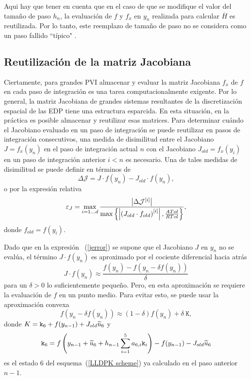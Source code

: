 Aqui hay que tener en cuenta que en el caso de que se modifique el valor del tamaño de paso $h_{n}$, la evaluación de $f$ y $f_x$ en $y_n$ realizada para calcular $\overline{H}$ es reutilizada. Por lo tanto, este reemplazo de tamaño de paso no se considera como un paso fallido ``típico" .

\subsection{Reutilización de la matriz Jacobiana}\label{secc:jaccontrol}
Ciertamente, para grandes PVI almacenar y evaluar la matriz Jacobiana $f_x$ de $f$ en cada paso de integración es una tarea computacionalmente exigente. Por lo general, la matriz Jacobiana de grandes sistemas resultantes de la discretización espacial de las EDP tiene una estructura esparcida. En esta situación, en la práctica es posible almacenar y reutilizar esas matrices. Para determinar cuándo el Jacobiano evaluado en un paso de integración se puede reutilizar en pasos de integración consecutivos, una medida de disimilitud entre el Jacobiano $J=f_x(y_n)$ en el paso de integración actual $n$ con el Jacobiano $J_{old}= f_x(y_{i})$ en un paso de integración anterior $i<n$ es necesario. Una de tales medidas de disimilitud se puede definir en términos de
\begin{equation*}
    \Delta \mathcal{J} = J\cdot f(y_n) - J_{old}\cdot f(y_n),
\end{equation*}
o por la expresión relativa
\begin{equation}\label{jerror}
    \varepsilon_J = \max_{i=1\ldots d}\frac{\left\lvert \Delta \mathcal{J}^{[i]} \right\rvert}
    {\max\left\{ \left\lvert  \left(J_{old}\cdot f_{old}\right)^{[i]}  \right\rvert ,\frac{ATol}{RTol} \right\}},
\end{equation}
donde $f_{old}=f(y_i)$.

Dado que en la expresión ~(\ref{jerror}) se supone que el Jacobiano $J$ en $y_n$ no se evalúa, el término $J\cdot f(y_n)$ es
aproximado por el cociente diferencial hacia atrás
\begin{equation}\label{backapprox}
    J\cdot f(y_n) \approx \frac{f(y_n) -
        f\left(y_n-\delta f(y_n)\right)}{\delta}
\end{equation}
para un $\delta>0$ lo suficientemente pequeño. Pero, en esta aproximación se requiere la evaluación de $f$ en un punto medio. Para evitar esto, se puede usar la aproximación convexa
\begin{equation}\label{aproxaprox}
    f\left(y_n-\delta f(y_n)\right) \approx
    (1-\delta) f(y_n)+ \delta \; \mathtt{K},
\end{equation}
donde $K = \mathtt{k}_{6} + f(y_{n-1}) + J_{old}\widetilde{u}_{6} $ y
\[ \mathtt{k}_6 = f\left( y_{n-1}+\widetilde{u}_6+h_{n-1} \sum_{i=1}^{5}a_{6,i}\mathtt{k}_i \right) - f(y_{n-1}) - J_{old}\widetilde{u}_6 \]
es el estado $6$ del esquema~(\ref{LLDPK scheme}) ya calculado en el paso anterior $n-1$.


